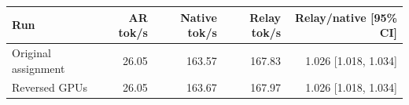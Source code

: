 \begin{tabular}{lrrrr}
\toprule
Run & AR tok/s & Native tok/s & Relay tok/s & Relay/native [95\% CI] \\
\midrule
Original assignment & 26.05 & 163.57 & 167.83 & 1.026 [1.018, 1.034] \\
Reversed GPUs & 26.05 & 163.67 & 167.97 & 1.026 [1.018, 1.034] \\
\bottomrule
\end{tabular}
